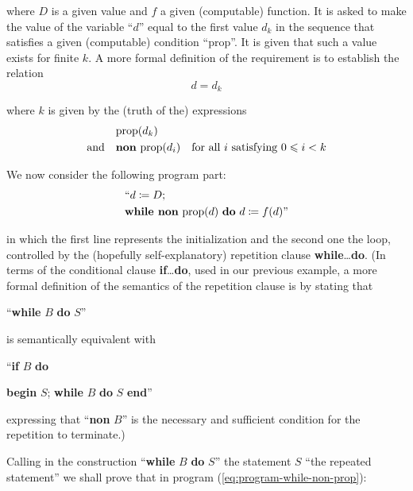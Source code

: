 \noindent
where $D$ is a given value and $f$ a given (computable) function. It is asked to make the value of the variable ``$d$'' equal to the first value $d_k$ in the sequence that satisfies a given (computable) condition ``prop''. It is given that such a value exists for finite $k$. A more formal definition of the requirement is to establish the relation
\begin{equation}
	\label{eq:induction-dk}
	d=d_k
\end{equation}

\noindent
where $k$ is given by the (truth of the) expressions
\begin{align}
	\label{eq:prod-dk}
	&\text{prop}(d_k)& \\
	\label{eq:non-prop-i}
	\text{and}\quad &\text{\textbf{non} prop}(d_i)& \text{for all } i \text{ satisfying } 0 \leqslant i < k
\end{align}

We now consider the following program part:
\begin{equation}
	\label{eq:program-while-non-prop}
	\begin{split}
		&\text{``}d \coloneq D;\\
		&\text{\textbf{while non} prop}(d) \text{ \textbf{do} } d \coloneq f(d)\text{''}
	\end{split}
\end{equation}

\noindent
in which the first line represents the initialization and the second one the loop, controlled by the (hopefully self-explanatory) repetition clause \textbf{while}\dots\textbf{do}. (In terms of the conditional clause \textbf{if}\dots\textbf{do}, used in our previous example, a more formal definition of the semantics of the repetition clause is by stating
that
\medskip

{
	\setlength{\parindent}{8em}
	\hspace{-.4em}``\textbf{while} $B$ \textbf{do} $S$''
}
\medskip

\noindent
is semantically equivalent with
\medskip

{
	\setlength{\parindent}{8em}
	\hspace{-.4em}``\textbf{if} $B$ \textbf{do}
	
	\quad \textbf{begin} $S$; \textbf{while} $B$ \textbf{do} $S$ \textbf{end}''
}
\medskip

\noindent
expressing that ``\textbf{non} $B$'' is the necessary and sufficient condition for the repetition to terminate.)

Calling in the construction ``\textbf{while} $B$ \textbf{do} $S$'' the statement $S$ ``the repeated statement'' we shall prove that in program (\ref{eq:program-while-non-prop}):

